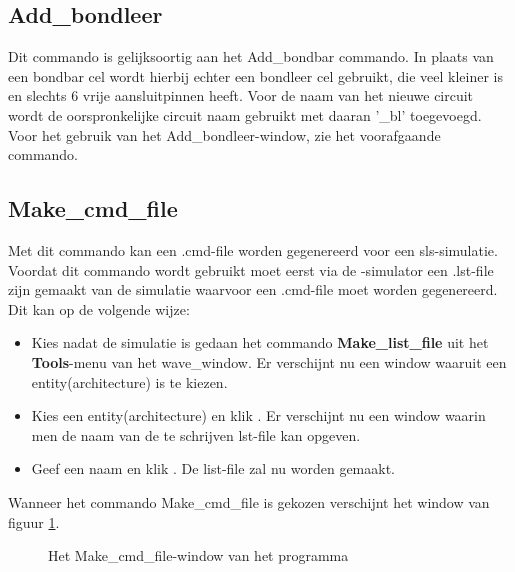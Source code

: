 \subsection{Add\_bondleer}
Dit commando is gelijksoortig aan het Add\_bondbar commando.
In plaats van een bondbar cel wordt hierbij echter een bondleer cel gebruikt,
die veel kleiner is en slechts 6 vrije aansluitpinnen heeft.
Voor de naam van het nieuwe circuit wordt de oorspronke\-lij\-ke circuit naam
gebruikt met daaran '\_bl' toegevoegd.
Voor het gebruik van het Add\_bondleer-window, zie het voorafgaande commando.

\subsection{Make\_cmd\_file}
Met dit commando kan een .cmd-file worden gegenereerd voor een sls-simulatie.
Voordat dit commando wordt gebruikt moet eerst via de -simulator
een .lst-file zijn gemaakt van de simulatie waarvoor een .cmd-file moet
worden gegenereerd.
Dit kan op de volgende wijze:
\begin{itemize}
\item Kies nadat de simulatie is gedaan het commando {\bf Make\_list\_file} uit het
      {\bf Tools}-menu van het wave\_window. Er verschijnt nu een window waaruit
      een entity(architecture) is te kiezen.
\item Kies een entity(architecture) en klik . Er verschijnt nu een window
      waarin men de naam van de te schrijven lst-file kan opgeven.
\item Geef een naam en klik . De list-file zal nu worden gemaakt.
\end{itemize}

Wanneer het commando Make\_cmd\_file is gekozen verschijnt het window van
figuur \ref{mk-cmd-window}.

\begin{figure}[htb]
\centerline{}
\caption{Het Make\_cmd\_file-window van het programma }
\label{mk-cmd-window}
\end{figure}

